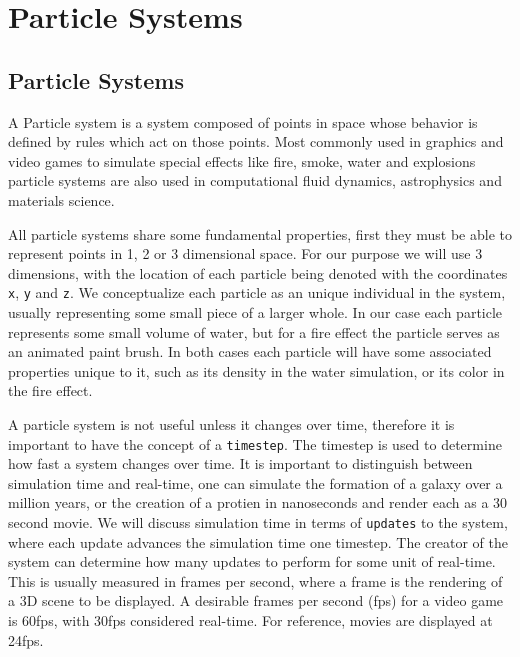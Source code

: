 \chapter{Particle Systems}

\section{Particle Systems}
A Particle system is a system composed of points in space whose behavior is
defined by rules which act on those points. Most commonly used in graphics and
video games to simulate special effects like fire, smoke, water and explosions
particle systems are also used in computational fluid dynamics, astrophysics
and materials science. 
\begin{comment}
\begin{figure}[!htc]
		\texttt{[image: figures/pretty\_particles.png]}
		\label{fig:logic}
        \caption{ pretty particle system picture }
\end{figure}
\end{comment}



All particle systems share some fundamental properties, first they must be able
to represent points in 1, 2 or 3 dimensional space. For our purpose we will use
3 dimensions, with the location of each particle being denoted with the
coordinates \verb|x|, \verb|y| and \verb|z|. We conceptualize each particle as
an unique individual in the system, usually representing some small piece of a
larger whole. In our case each particle represents some small volume of water,
but for a fire effect the particle serves as an animated paint brush. In both
cases each particle will have some associated properties unique to it, such as
its density in the water simulation, or its color in the fire effect.


A particle system is not useful unless it changes over time, therefore it is
important to have the concept of a \verb|timestep|. The timestep is used to
determine how fast a system changes over time. It is important to distinguish
between simulation time and real-time, one can simulate the formation of a
galaxy over a million years, or the creation of a protien in nanoseconds and
render each as a 30 second movie. We will discuss simulation time in terms of
\verb|updates| to the system, where each update advances the simulation time
one timestep. The creator of the system can determine how many updates to
perform for some unit of real-time. This is usually measured in frames per
second, where a frame is the rendering of a 3D scene to be displayed. A
desirable frames per second (fps) for a video game is 60fps, with 30fps
considered real-time. For reference, movies are displayed at 24fps. 


